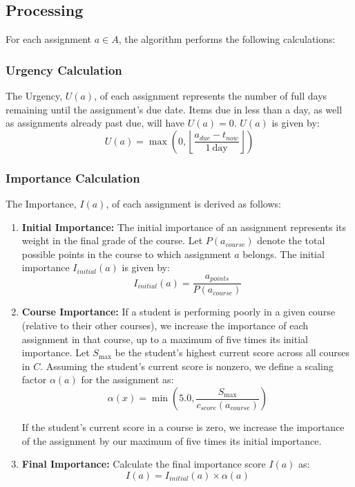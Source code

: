 \documentclass[letterpaper]{jdf}
\begin{document}
\subsection{Processing}

For each assignment \( a \in A \), the algorithm performs the following calculations:

\subsubsection{Urgency Calculation}

The Urgency, \( U(a) \), of each assignment represents the number of full days remaining until the assignment's due date. Items due in less than a day, as well as assignments already past due, will have \( U(a) = 0 \). \( U(a) \) is given by:
\[
U(a) = \max\left(0, \left\lfloor \frac{a_{due} - t_{now}}{1\ \text{day}} \right\rfloor \right)
\]

\subsubsection{Importance Calculation}

The Importance, \( I(a) \), of each assignment is derived as follows:

\begin{enumerate}
    \item \textbf{Initial Importance:} The initial importance of an assignment represents its weight in the final grade of the course. Let \( P(a_{course}) \) denote the total possible points in the course to which assignment \( a \) belongs. The initial importance \( I_{initial}(a) \) is given by:
    \[
    I_{initial}(a) = \frac{a_{points}}{P(a_{course})}
    \]

    \item \textbf{Course Importance:} If a student is performing poorly in a given course (relative to their other courses), we increase the importance of each assignment in that course, up to a maximum of five times its initial importance. Let \( S_{\max} \) be the student's highest current score across all courses in \( C \). Assuming the student's current score is nonzero, we define a scaling factor \( \alpha(a) \) for the assignment as:
    \[
      \alpha(x)=\min\left(5.0, \frac{S_{\max}}{c_{score}(a_{course})}\right)
    \]
    
    If the student's current score in a course is zero, we increase the importance of the assignment by our maximum of five times its initial importance.

    \item \textbf{Final Importance:} Calculate the final importance score \( I(a) \) as:
    \[
    I(a) = I_{initial}(a) \times \alpha(a)
    \]
\end{enumerate}
\end{document}
